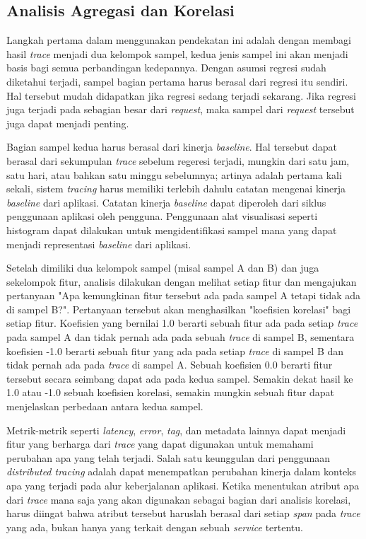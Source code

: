 \subsection{Analisis Agregasi dan Korelasi}
\label{approach-corr}

Langkah pertama dalam menggunakan pendekatan ini adalah dengan membagi hasil \textit{trace} menjadi dua kelompok sampel, kedua jenis sampel ini akan menjadi basis bagi semua perbandingan kedepannya. Dengan asumsi regresi sudah diketahui terjadi, sampel bagian pertama harus berasal dari regresi itu sendiri. Hal tersebut mudah didapatkan jika regresi sedang terjadi sekarang. Jika regresi juga terjadi pada sebagian besar dari \textit{request}, maka sampel dari \textit{request} tersebut juga dapat menjadi penting. 

Bagian sampel kedua harus berasal dari kinerja \textit{baseline}. Hal tersebut dapat berasal dari sekumpulan \textit{trace} sebelum regeresi terjadi, mungkin dari satu jam, satu hari, atau bahkan satu minggu sebelumnya; artinya adalah pertama kali sekali, sistem \textit{tracing} harus memiliki terlebih dahulu catatan mengenai kinerja \textit{baseline} dari aplikasi. Catatan kinerja \textit{baseline} dapat diperoleh dari siklus penggunaan aplikasi oleh pengguna. Penggunaan alat visualisasi seperti histogram dapat dilakukan untuk mengidentifikasi sampel mana yang dapat menjadi representasi \textit{baseline} dari aplikasi.

Setelah dimiliki dua kelompok sampel (misal sampel A dan B) dan juga sekelompok fitur, analisis dilakukan dengan melihat setiap fitur dan mengajukan pertanyaan "Apa kemungkinan fitur tersebut ada pada sampel A tetapi tidak ada di sampel B?". Pertanyaan tersebut akan menghasilkan "koefisien korelasi" bagi setiap fitur. Koefisien yang bernilai 1.0 berarti sebuah fitur ada pada setiap \textit{trace} pada sampel A dan tidak pernah ada pada sebuah \textit{trace} di sampel B, sementara koefisien -1.0 berarti sebuah fitur yang ada pada setiap \textit{trace} di sampel B dan tidak pernah ada pada \textit{trace} di sampel A. Sebuah koefisien 0.0 berarti fitur tersebut secara seimbang dapat ada pada kedua sampel. Semakin dekat hasil ke 1.0 atau -1.0 sebuah koefisien korelasi, semakin mungkin sebuah fitur dapat menjelaskan perbedaan antara kedua sampel.

Metrik-metrik seperti \textit{latency}, \textit{error}, \textit{tag}, dan metadata lainnya dapat menjadi fitur yang berharga dari \textit{trace} yang dapat digunakan untuk memahami perubahan apa yang telah terjadi. Salah satu keunggulan dari penggunaan \textit{distributed tracing} adalah dapat menempatkan perubahan kinerja dalam konteks apa yang terjadi pada alur keberjalanan aplikasi. Ketika menentukan atribut apa dari \textit{trace} mana saja yang akan digunakan sebagai bagian dari analisis korelasi, harus diingat bahwa atribut tersebut haruslah berasal dari setiap \textit{span} pada \textit{trace} yang ada, bukan hanya yang terkait dengan sebuah \textit{service} tertentu.

